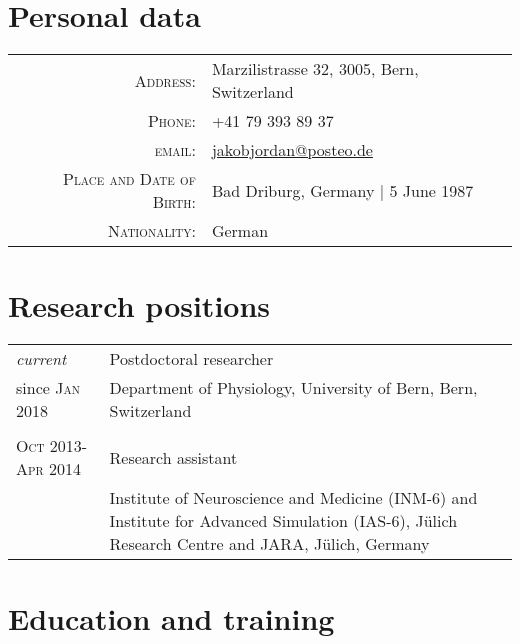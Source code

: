 \documentclass[a4paper,10pt]{article}
\begin{document}
\pagestyle{empty}

\par{\bigskip\par}

\section{Personal data}

\begin{longtable}{rl}
\textsc{Address:} & Marzilistrasse 32, 3005, Bern, Switzerland \\
\textsc{Phone:} & +41 79 393 89 37 \\
\textsc{email:} & \href{mailto:jakobjordan@posteo.de}{jakobjordan@posteo.de} \\
\textsc{Place and Date of Birth:} & Bad Driburg, Germany | 5 June 1987 \\
\textsc{Nationality:} & German
\end{longtable}

\section{Research positions}
\begin{longtable}{>{\hfill}p{3.15cm}|p{10.4cm}}
\emph{current} & Postdoctoral researcher \\
since \textsc{Jan 2018}& \footnotesize Department of Physiology, University of Bern, Bern, Switzerland \\
  \multicolumn{2}{c}{} \\
\textsc{Oct} 2013-\textsc{Apr} 2014 & Research assistant \\
& \footnotesize Institute of Neuroscience and Medicine (INM-6) and Institute for Advanced Simulation (IAS-6), J\"ulich Research Centre and JARA, J\"ulich, Germany\\
\end{longtable}

\section{Education and training}
\end{document}
